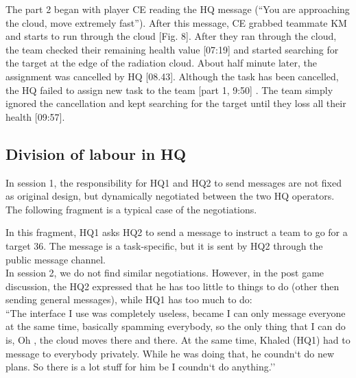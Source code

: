 The part 2 began with player CE reading the HQ message (``You are approaching the cloud, move extremely fast''). After this message, CE grabbed teammate KM and starts to run through the cloud [Fig. 8].  After they ran through the cloud, the team checked their remaining health value [07:19] and started searching for the target at the edge of the radiation cloud. About half minute later, the assignment was cancelled by HQ [08.43]. Although the task has been cancelled, the HQ failed to assign new task to the team [part 1, 9:50] . The team simply ignored the cancellation and kept searching for the target until they loss all their health [09:57]. \\

\subsection{Division of labour in HQ}

In session 1, the responsibility for HQ1 and HQ2 to send messages are not fixed as original design, but dynamically negotiated between the two HQ operators. The following fragment is a typical case of the negotiations.\\

\noindent{}

In this fragment, HQ1 asks HQ2 to send a message to instruct a team to go for a target 36. The message is a task-specific, but it is sent by HQ2 through the public message channel.\\

In session 2, we do not find similar negotiations. However, in the post game discussion, the HQ2 expressed that he has too little to things to do (other then sending general messages), while HQ1 has too much to do:\\

``The interface I use was completely useless, became I can only message everyone at the same time, basically spamming everybody, so the only thing that I can do is, Oh , the cloud moves there and there. At the same time, Khaled (HQ1) had to message to everybody privately. While he was doing that, he coundn`t do new plans. So there is a lot stuff for him be I coundn`t do anything.''\\


